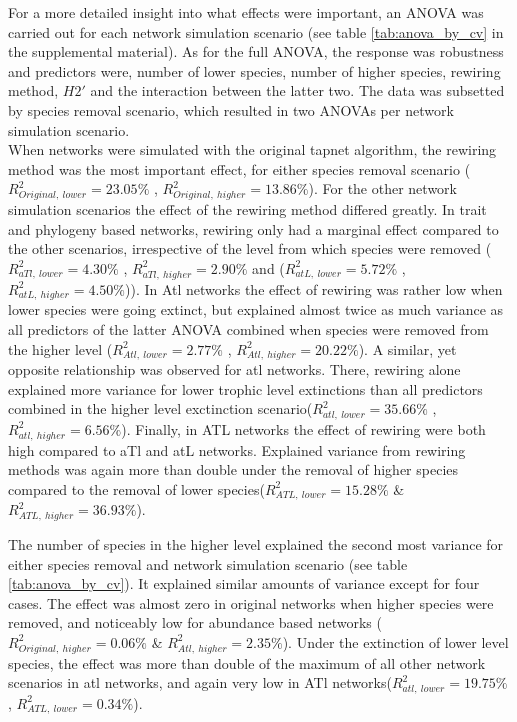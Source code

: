 \documentclass[12pt,a4paper]{article}
\begin{document}
For a more detailed insight into what effects were important, an ANOVA was carried out for each network simulation scenario (see table \ref{tab:anova_by_cv} in the supplemental material). As for the full ANOVA, the response was robustness and predictors were, number of lower species, number of higher species, rewiring method, $H2'$ and the interaction between the latter two. The data was subsetted by species removal scenario, which resulted in two ANOVAs per network simulation scenario. \\
When networks were simulated with the original tapnet algorithm, the rewiring method was the most important effect, for either species removal scenario ($R^2_{Original,\: lower} = 23.05\%$ , $R^2_{Original,\: higher} = 13.86\%$). For the other network simulation scenarios the effect of the rewiring method differed greatly. In trait and phylogeny based networks, rewiring only had a marginal effect compared to the other scenarios, irrespective of the level from which species were removed ($R^2_{aTl,\: lower} = 4.30\%$ , $R^2_{aTl,\: higher} = 2.90\%$ and ($R^2_{atL,\: lower} = 5.72\%$ , $R^2_{atL,\: higher} = 4.50\%$)). In Atl networks the effect of rewiring was rather low when lower species were going extinct, but explained almost twice as much variance as all predictors of the latter ANOVA combined when species were removed from the higher level ($R^2_{Atl,\: lower} = 2.77\%$ , $R^2_{Atl,\: higher} = 20.22\%$). A similar, yet opposite relationship was observed for atl networks. There, rewiring alone explained more variance for lower trophic level extinctions than all predictors combined in the higher level exctinction scenario($R^2_{atl,\: lower} = 35.66\%$ , $R^2_{atl,\: higher} = 6.56\%$). Finally, in ATL networks the effect of rewiring were both high compared to aTl and atL networks. Explained variance from rewiring methods was again more than double under the removal of higher species compared to the removal of lower species($R^2_{ATL,\: lower} = 15.28	\%$ \& $R^2_{ATL,\: higher} = 36.93\%$).

The number of species in the higher level explained the second most variance for either species removal and network simulation scenario (see table \ref{tab:anova_by_cv}). It explained similar amounts of variance except for four cases. The effect was almost zero in original networks when higher species were removed, and noticeably low for abundance based networks ($R^2_{Original,\: higher} = 0.06\%$ \& $R^2_{Atl,\: higher} = 2.35\%$). Under the extinction of lower level species, the effect was more than double of the maximum of all other network scenarios in atl networks, and again very low in ATl networks($R^2_{atl,\: lower} = 19.75 \%$ , $R^2_{ATL,\: lower} = 0.34\%$).
\end{document}
